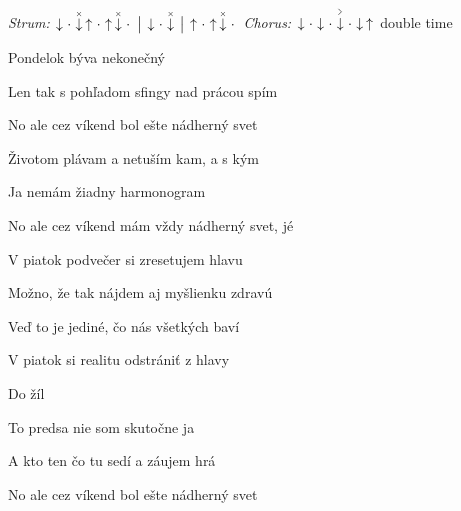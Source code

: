 \begin{song}


\begin{headerbox}
\RaiseBoxWithAccents
\textit{Strum:} $\Down\Miss\ChuckDown\Up\Miss\Up\ChuckDown\Miss \Separator \Down\Miss\ChuckDown \Separator \Up\Miss\Up\ChuckDown\Miss$ \quad
\textit{Chorus:} $\Down\Miss\Down\Miss\AccentDown\Miss\Down\Up$ double time
\end{headerbox}

\begin{hchordbox}
\end{hchordbox}

\Large

\bigskip

 Pondelok býva nekonečný \par
Len tak  s pohľadom sfingy nad prácou spím \par
No ale cez víkend bol  ešte nádherný svet \par

\bigskip

 Životom plávam a netuším kam, a s kým \par
{} Ja nemám žiadny harmonogram \par
No ale cez víkend mám  vždy nádherný svet, jé \par

\bigskip

\begin{chorusbox}{\Refren}
V piatok podvečer si zresetujem hlavu \par
{}Možno, že tak nájdem aj myšlienku zdravú  \par
{} Veď to je jediné, čo  nás všetkých baví \par
{} V piatok si realitu  odstrániť z hlavy \par
Do žíl   \par
\end{chorusbox}

\bigskip

 To predsa nie som skutočne ja \par
A kto  ten čo tu sedí a záujem hrá \par
No ale cez víkend bol  ešte nádherný svet \par


\end{song}
